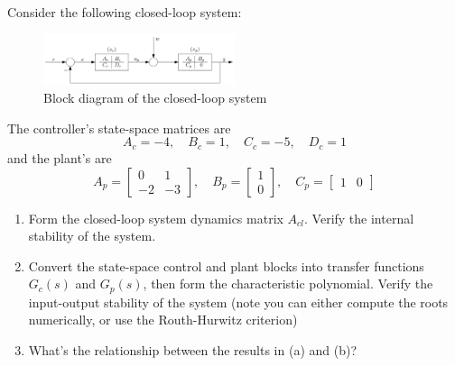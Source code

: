 \section{}
Consider the following closed-loop system:
\begin{figure}[h]
    \centering
    \includegraphics[width=0.5\textwidth]{Questions/Figures/Q3ProblemDiagram.png}
    \caption{Block diagram of the closed-loop system}
    \label{fig:Q3ProblemDiagram}
\end{figure}
The controller's state-space matrices are
\begin{equation*}
    A_c = -4, \quad B_c = 1, \quad C_c = -5, \quad D_c = 1
\end{equation*}
and the plant's are
\begin{equation*}
    A_p = \begin{bmatrix}
        0 & 1 \\
        -2 & -3
    \end{bmatrix}, \quad
    B_p = \begin{bmatrix}
        1 \\
        0
    \end{bmatrix}, \quad
    C_p = \begin{bmatrix}
        1 & 0
    \end{bmatrix}
\end{equation*}
\begin{enumerate}[label=(\alph*)]
    \item Form the closed-loop system dynamics matrix $A_{cl}$. Verify the internal stability of the system.
    \item Convert the state-space control and plant blocks into transfer functions $G_c(s)$ and $G_p(s)$, then form the characteristic polynomial. Verify the input-output stability of the system (note you can either compute the roots numerically, or use the Routh-Hurwitz criterion)
    \item What's the relationship between the results in (a) and (b)?
\end{enumerate}

